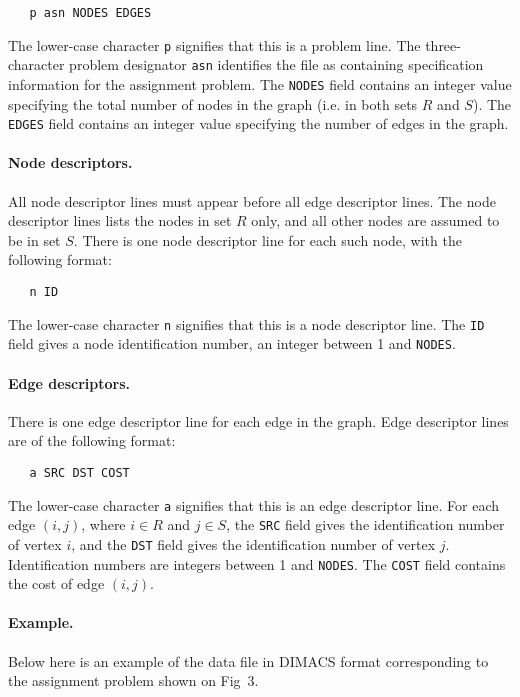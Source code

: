 \begin{verbatim}
   p asn NODES EDGES
\end{verbatim}

\noindent
The lower-case character \verb|p| signifies that this is a problem line.
The three-character problem designator \verb|asn| identifies the file as
containing specification information for the assignment problem.
The \verb|NODES| field contains an integer value specifying the total
number of nodes in the graph (i.e. in both sets $R$ and $S$). The
\verb|EDGES| field contains an integer value specifying the number of
edges in the graph.

\paragraph{Node descriptors.} All node descriptor lines must appear
before all edge descriptor lines. The node descriptor lines lists the
nodes in set $R$ only, and all other nodes are assumed to be in set
$S$. There is one node descriptor line for each such node, with the
following format:

\begin{verbatim}
   n ID
\end{verbatim}

\noindent
The lower-case character \verb|n| signifies that this is a node
descriptor line. The \verb|ID| field gives a node identification number,
an integer between 1 and \verb|NODES|.

\paragraph{Edge descriptors.} There is one edge descriptor line for
each edge in the graph. Edge descriptor lines are of the following
format:

\begin{verbatim}
   a SRC DST COST
\end{verbatim}

\noindent
The lower-case character \verb|a| signifies that this is an edge
descriptor line. For each edge $(i,j)$, where $i\in R$ and $j\in S$,
the \verb|SRC| field gives the identification number of vertex $i$, and
the \verb|DST| field gives the identification number of vertex $j$.
Identification numbers are integers between 1 and \verb|NODES|. The
\verb|COST| field contains the cost of edge $(i,j)$.

\paragraph{Example.} Below here is an example of the data file in
DIMACS format corresponding to the assignment problem shown on Fig~3.

